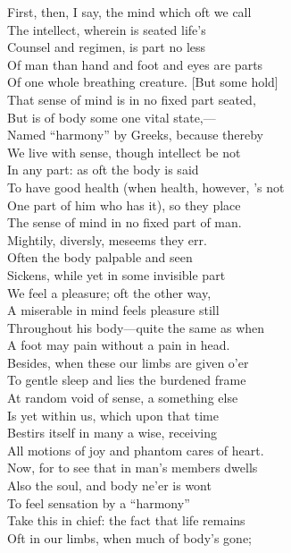First, then, I say, the mind which oft we call\\
The intellect, wherein is seated life's\\
Counsel and regimen, is part no less\\
Of man than hand and foot and eyes are parts\\
Of one whole breathing creature. [But some hold]\\
That sense of mind is in no fixed part seated,\\
But is of body some one vital state,—\\
Named ``harmony'' by Greeks, because thereby\\
We live with sense, though intellect be not\\
In any part: as oft the body is said\\
To have good health (when health, however, 's not\\
One part of him who has it), so they place\\
The sense of mind in no fixed part of man.\\
Mightily, diversly, meseems they err.\\
Often the body palpable and seen\\
Sickens, while yet in some invisible part\\
We feel a pleasure; oft the other way,\\
A miserable in mind feels pleasure still\\
Throughout his body—quite the same as when\\
A foot may pain without a pain in head.\\
Besides, when these our limbs are given o'er\\
To gentle sleep and lies the burdened frame\\
At random void of sense, a something else\\
Is yet within us, which upon that time\\
Bestirs itself in many a wise, receiving\\
All motions of joy and phantom cares of heart.\\
Now, for to see that in man's members dwells\\
Also the soul, and body ne'er is wont\\
To feel sensation by a ``harmony''\\
Take this in chief: the fact that life remains\\
Oft in our limbs, when much of body's gone;\\
